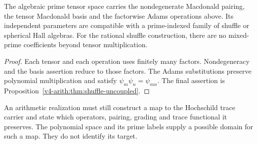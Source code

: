 \begin{proposition}\label{v4-arith:thm:parameter-non-uniformity}
The algebraic prime tensor space carries the nondegenerate
Macdonald pairing, the tensor Macdonald basis and the factorwise
Adams operations above. Its independent parameters are compatible
with a prime-indexed family of shuffle or spherical Hall algebras.
For the rational shuffle construction, there are no mixed-prime
coefficients beyond tensor multiplication.
\end{proposition}
\begin{proof}
Each tensor and each operation uses finitely many factors.
Nondegeneracy and the basis assertion reduce to those factors.
The Adams substitutions preserve polynomial multiplication and
satisfy $\psi_m\psi_n=\psi_{mn}$. The final assertion is
Proposition~\ref{v4-arith:thm:shuffle-uncoupled}.
\end{proof}

An arithmetic realization must still construct a map to the
Hochschild trace carrier and state which operators, pairing,
grading and trace functional it preserves. The polynomial space
and its prime labels supply a possible domain for such a map.
They do not identify its target.
